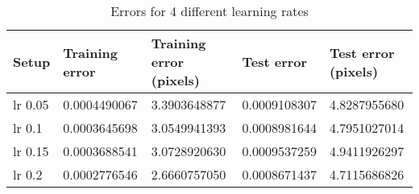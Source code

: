 \begin{table}[h!]
\centering
\footnotesize
\begin{tabular}{|l|l|l|l|l|}
	\hline
		\textbf{Setup} & \textbf{Training error} & \textbf{Training error (pixels)} & \textbf{Test error} & \textbf{Test error (pixels)}\\
	\hline
		lr 0.05	& 0.0004490067%
				& 3.3903648877%
				& 0.0009108307%
				& 4.8287955680%
				\\
	\hline
		lr 0.1 	& 0.0003645698%
				& 3.0549941393%
				& 0.0008981644%
				& 4.7951027014%
				\\
	\hline
		lr 0.15	& 0.0003688541%
				& 3.0728920630%
				& 0.0009537259%
				& 4.9411926297%
				\\
	\hline
		lr 0.2 	& 0.0002776546%
				& 2.6660757050%
				& 0.0008671437%
				& 4.7115686826%
				\\
	\hline
	\end{tabular}
	\normalsize
	\caption{Errors for 4 different learning rates}
	\label{tab:cnn_errors_learningrates}
\end{table}

